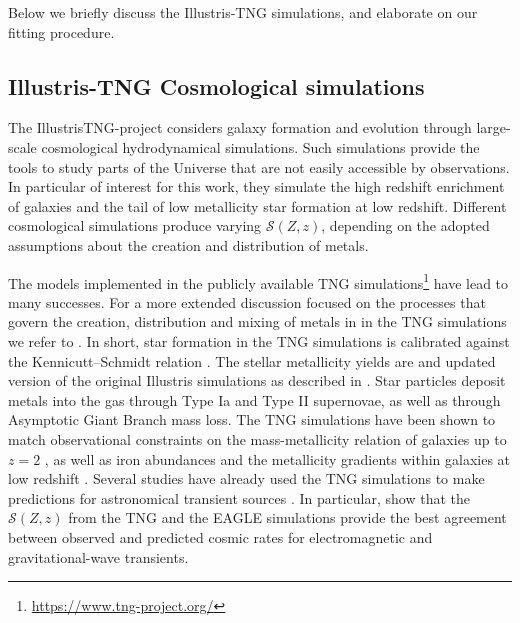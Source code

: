\documentclass[twocolumn]{aastex631}
\newcommand{\SFRDzZ}{\ensuremath{\mathcal{S}(Z,z)}\xspace}
\begin{document}
Below we briefly discuss the Illustris-TNG simulations, and elaborate on our fitting procedure.




\subsection{Illustris-TNG Cosmological simulations}
The IllustrisTNG-project \citep[or TNG in short][]{FirstResTNG_Springel2018,FirstResTNG_Marinacci2018, FirstResTNG_Nelson2018,FirstResTNG_Pillepich2018, FirstResTNG_Naiman2018} considers galaxy formation and evolution through large-scale cosmological hydrodynamical simulations.
Such simulations provide the tools to study parts of the Universe that are not easily accessible by observations. In particular of interest for this work, they simulate the high redshift enrichment of galaxies and the tail of low metallicity star formation at low redshift.
Different cosmological simulations produce varying \SFRDzZ, depending on the adopted assumptions about the creation and distribution of metals. 

The models implemented in the publicly available TNG simulations\footnote{ \url{https://www.tng-project.org/}} have lead to many successes. For a more extended discussion focused on the processes that govern the creation, distribution and mixing of metals in in the TNG simulations we refer to \cite{Pakmor+2022}. In short, star formation in the TNG simulations is calibrated against the Kennicutt–Schmidt relation \citep[][]{Schmidt1959,Kennicutt1989}. The stellar metallicity yields are and updated version of the original Illustris simulations as described in \cite{Pillepich2018}. Star particles deposit metals into the gas through Type Ia and Type II supernovae, as well as through Asymptotic Giant Branch mass loss. 
The TNG simulations have been shown to match observational constraints on the mass-metallicity relation of galaxies up to $z = 2$ \citep{Torrey+2019}, as well as iron abundances \citep{FirstResTNG_Naiman2018} and the metallicity gradients within galaxies at low redshift \citep{Hemler+2021}. %
Several studies have already used the TNG simulations to make predictions for astronomical transient sources \citep[e.g.][]{Briel+2021,Bavera+2022}. In particular, \cite{Briel+2021} show that the \SFRDzZ from the TNG and the EAGLE \citep{Schaye+2015,Crain+2015} simulations provide the best agreement between observed and predicted cosmic rates for electromagnetic and gravitational-wave transients. 
\end{document}
